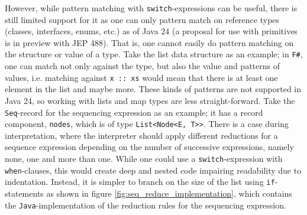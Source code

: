 However, while pattern matching with \texttt{switch}-expressions can be useful, there is still limited support for it as one
can only pattern match on reference types (classes, interfaces, enums, etc.) as of Java 24 (a proposal for use with primitives is in preview with JEP 488\cite{jep488}).
That is, one cannot easily do pattern matching on the structure or value of a type. Take the list data structure as an example;
in \texttt{F\#}, one can match not only against the type, but also the value and patterns of values, i.e. matching against \texttt{x :: xs}
would mean that there is at least one element in the list and maybe more. These kinds of patterns are not supported in Java 24, so working with lists and
map types are less straight-forward. Take the \texttt{Seq}-record for the sequencing expression as an example; it has a record component,
\texttt{nodes}, which is of type \texttt{List<Node<E, T>>}. There is a case during interpretation, where the interpreter should apply
different reductions for a sequence expression depending on the number of successive expressions, namely none, one and more than one.
While one could use a \texttt{switch}-expression with \texttt{when}-clauses, this would create deep and nested code impairing readability
due to indentation. Instead, it is simpler to branch on the size of the list using \texttt{if}-statements as shown in figure \ref{fig:seq_reduce_implementation},
which contains the \texttt{Java}-implementation of the reduction rules for the sequencing expression.

